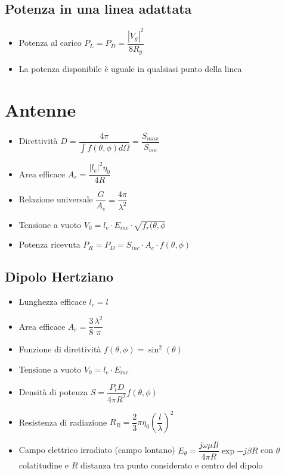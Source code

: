 \documentclass{article}
\begin{document}
\subsection{Potenza in una linea adattata}
\begin{itemize}
	\item Potenza al carico \(P_L = P_D = \dfrac{|V_g|^2}{8 R_g} \)
	\item La potenza disponibile è uguale in qualsiasi punto della linea
\end{itemize}
\newpage

\section{Antenne}
\begin{itemize}
	\item Direttività \( \displaystyle D = \dfrac{4 \pi}{\int{f(\theta, \phi) d \Omega}} = \dfrac{S_{max}}{S_{iso}} \)	
	\item Area efficace \( \displaystyle A_e = \dfrac{|l_e| ^ 2 \eta_0}{4 R} \)
	\item Relazione universale \( \dfrac{G}{A_e} = \dfrac{4 \pi}{\lambda^2} \)
	\item Tensione a vuoto \( V_0 = l_e \cdot E_{inc} \cdot \sqrt{f_r(\theta, \phi} \)
	\item Potenza ricevuta \(P_R = P_D = S_{inc} \cdot A_e \cdot  f(\theta, \phi) \)
\end{itemize}

\subsection{Dipolo Hertziano}
\begin{itemize}
	\item Lunghezza efficace \(l_e = l\)
	\item Area efficace \(A_e = \dfrac{3}{8} \dfrac{\lambda^2}{\pi} \)
	\item Funzione di direttività \(f(\theta, \phi) = \sin^2(\theta) \)
	\item Tensione a vuoto \( V_0 = l_e \cdot E_{inc} \) 
	\item Densità di potenza \( S = \dfrac{P_t D}{4 \pi R^2} f(\theta, \phi) \)
	\item Resistenza di radiazione \( R_R = \dfrac{2}{3} \pi \eta_0 \left( \dfrac{l}{\lambda} \right) ^ 2 \)
	\item Campo elettrico irradiato (campo lontano) \( E_\theta = \dfrac{j \omega \mu I l}{4 \pi R} \exp{-j \beta R}\) con \(\theta\) colatitudine e \(R\) distanza tra punto considerato e centro del dipolo
\end{itemize}
\end{document}
